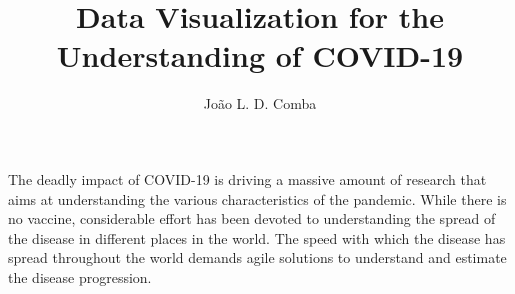 \documentclass[10pt,journal,compsoc]{IEEEtran}
\newcommand{\cv}{COVID-19\xspace}
\begin{document}
\title{Data Visualization for the Understanding of \cv}



\author{%
	João L. D. Comba
	}




\maketitle



The deadly impact of \cv is driving a massive amount of research that aims at understanding the various characteristics of the pandemic. While there is no vaccine, considerable effort has been devoted to understanding the spread of the disease in different places in the world. The speed with which the disease has spread throughout the world demands agile solutions to understand and estimate the disease progression.
\end{document}
